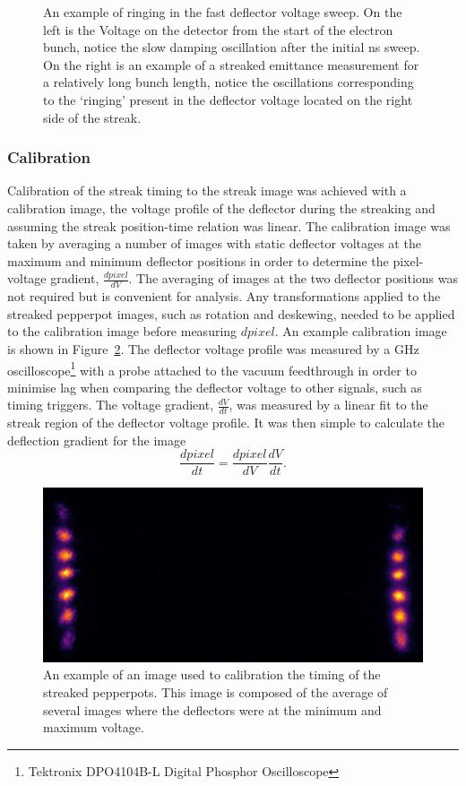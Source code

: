 \begin{figure}
    \center
    
    \caption[Streak deflector voltage oscillations.]{An example of ringing in the fast deflector voltage sweep. On the left is the Voltage on the detector from the start of the electron bunch, notice the slow damping oscillation after the initial \unit[10]{ns} sweep. On the right is an example of a streaked emittance measurement for a relatively long bunch length, notice the oscillations corresponding to the `ringing' present in the deflector voltage located on the right side of the streak.}
    \label{figure:ringing}
\end{figure}

\subsubsection{Calibration}
Calibration of the streak timing to the streak image was achieved with a calibration image, the voltage profile of the deflector during the streaking and assuming the streak position-time relation was linear.
The calibration image was taken by averaging a number of images with static deflector voltages at the maximum and minimum deflector positions in order to determine the pixel-voltage gradient, $\frac{dpixel}{dV}$.
The averaging of images at the two deflector positions was not required but is convenient for analysis.
Any transformations applied to the streaked pepperpot images, such as rotation and deskewing, needed to be applied to the calibration image before measuring $dpixel$.
An example calibration image is shown in Figure~\ref{figure:example_calibration}.
The deflector voltage profile was measured by a \unit[1]{GHz} oscilloscope\footnote{Tektronix DPO4104B-L Digital Phosphor Oscilloscope} with a probe attached to the vacuum feedthrough in order to minimise lag when comparing the deflector voltage to other signals, such as timing triggers.
The voltage gradient, $\frac{dV}{dt}$, was measured by a linear fit to the streak region of the deflector voltage profile.
It was then simple to calculate the  deflection gradient for the image
\begin{equation}
\frac{dpixel}{dt} = \frac{dpixel}{dV} \frac{dV}{dt}.
\end{equation}

\begin{figure}
    \center
    \includegraphics[width=0.5\linewidth]{part2/Figs/example_calibration.jpeg}
    \caption[Streaked pepperpot calibration image.]{An example of an image used to calibration the timing of the streaked pepperpots.
    This image is composed of the average of several images where the deflectors were at the minimum and maximum voltage.}
    \label{figure:example_calibration}
\end{figure}

